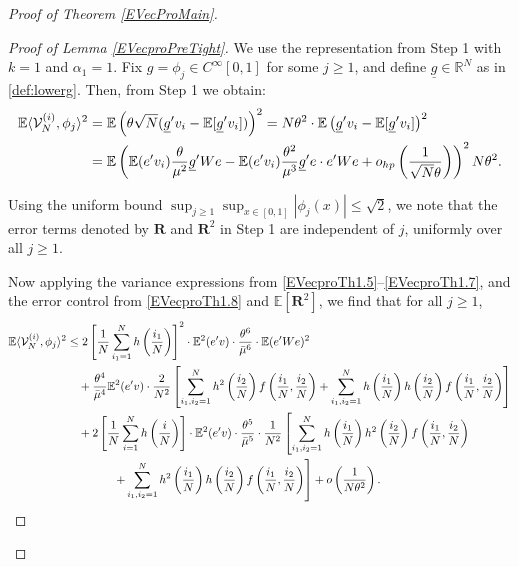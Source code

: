 \documentclass[11pt, reqno]{amsart}
\numberwithin{equation}{section}
\newcommand{\E}{\mbox{${\mathbb E}$}}
\begin{document}
\begin{proof}[Proof of Theorem \ref{EVecProMain}]
\begin{proof}[Proof of Lemma \ref{EVecproPreTight}]
We use the representation from Step 1 with \( k = 1 \) and \( \alpha_1 = 1 \). Fix \( g = \phi_j \in C^\infty[0,1] \) for some \( j \ge 1 \), and define \( \underline{g} \in \mathbb{R}^N \) as in \eqref{def:lowerg}. Then, from Step 1 we obtain:
\begin{align}
\mathbb{E} \langle \mathcal V^{(i)}_N, \phi_j \rangle^2 
&= \mathbb{E}\left( \theta \sqrt{N} (\underline{g}'v_i - \mathbb{E}[\underline{g}'v_i]) \right)^2 
= N\theta^2 \cdot \mathbb{E} \left( \underline{g}'v_i - \mathbb{E}[\underline{g}'v_i] \right)^2 \notag \\
&= \mathbb{E}\left( \mathbb{E}(e^\prime v_i)\frac{\theta}{\mu^2} \underline{g}'We 
- \mathbb{E}(e^\prime v_i)\frac{\theta^2}{\mu^3}\underline{g}'e \cdot e'We 
+ o_{hp}\left(\frac{1}{\sqrt{N}\theta}\right) \right)^2 N\theta^2. \label{EVecproTight1.1}
\end{align}

Using the uniform bound \( \sup_{j \ge 1} \sup_{x \in [0,1]} |\phi_j(x)| \le \sqrt{2} \), we note that the error terms denoted by \( \mathbf{R} \) and \( \mathbf{R}^2 \) in Step 1 are independent of \( j \), uniformly over all \( j \ge 1 \).

Now applying the variance expressions from \eqref{EVecproTh1.5}--\eqref{EVecproTh1.7}, and the error control from \eqref{EVecproTh1.8} and $\E[\mathbf R^2]$, we find that for all \( j \ge 1 \),
\begin{align}
\mathbb{E} \langle \mathcal V^{(i)}_N, \phi_j \rangle^2 
&\le 2 \left[ \frac{1}{N} \sum_{i_1=1}^N h\left( \frac{i_1}{N} \right) \right]^2 \cdot \mathbb{E}^2(e'v) \cdot \frac{\theta^6}{\bar{\mu}^6} \cdot \mathbb{E}(e'We)^2 \notag \\
&\quad + \frac{\theta^4}{\bar{\mu}^4} \mathbb{E}^2(e'v) \cdot \frac{2}{N^2} \left[ \sum_{i_1,i_2=1}^N h^2\left( \frac{i_2}{N} \right) f\left( \frac{i_1}{N}, \frac{i_2}{N} \right) + \sum_{i_1,i_2=1}^N h\left( \frac{i_1}{N} \right) h\left( \frac{i_2}{N} \right) f\left( \frac{i_1}{N}, \frac{i_2}{N} \right) \right] \notag \\
&\quad + 2 \left[ \frac{1}{N} \sum_{i=1}^N h\left( \frac{i}{N} \right) \right] \cdot \mathbb{E}^2(e'v) \cdot \frac{\theta^5}{\bar{\mu}^5} \cdot \frac{1}{N^2} \left[ \sum_{i_1,i_2=1}^N h\left( \frac{i_1}{N} \right) h^2\left( \frac{i_2}{N} \right) f\left( \frac{i_1}{N}, \frac{i_2}{N} \right) \right. \notag \\
&\hspace{4em} \left. + \sum_{i_1,i_2=1}^N h^2\left( \frac{i_1}{N} \right) h\left( \frac{i_2}{N} \right) f\left( \frac{i_1}{N}, \frac{i_2}{N} \right) \right] + o\left( \frac{1}{N\theta^2} \right). \label{EVecproTight1.11}
\end{align}


\end{proof}
\end{proof}
\end{document}

